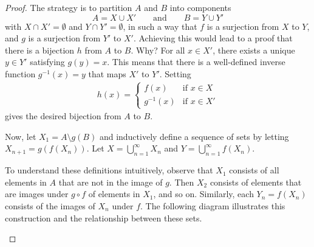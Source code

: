 \documentclass[11pt,twoside=off,numbers=noenddot]{scrbook}
\begin{document}
\begin{proof}
  The strategy is to partition $A$ and $B$ into components
  \[ A = X \cup X' \qquad \text{and} \qquad B = Y \cup Y' \]
  with $X \cap X' = \emptyset$ and $Y \cap Y' = \emptyset$, in such a
  way that $f$ is a surjection from $X$ to $Y$, and $g$ is a
  surjection from $Y'$ to $X'$. Achieving this would lead to a proof
  that there is a bijection $h$ from $A$ to $B$. Why? For all $x \in
  X'$, there exists a unique $y \in Y'$ satisfying $g(y) = x$. This
  means that there is a well-defined inverse function $g^{-1}(x) = y$
  that maps $X'$ to $Y'$. Setting
  \begin{align*}
    h(x) =
    \begin{cases}
      f(x) & \text{if $x \in X$} \\
      g^{-1}(x) & \text{if $x \in X'$}
    \end{cases}
  \end{align*}
  gives the desired bijection from $A$ to $B$.

  Now, let $X_1 = A \setminus g(B)$ and inductively define a sequence
  of sets by letting $X_{n + 1} = g(f(X_n))$.  Let $X = \bigcup_{n =
  1}^{\infty} X_n$ and $Y = \bigcup_{n = 1}^{\infty} f(X_n)$.

  To understand these definitions intuitively, observe that $X_1$
  consists of all elements in $A$ that are not in the image of $g$.
  Then $X_2$ consists of elements that are images under $g \circ f$
  of elements in $X_1$, and so on. Similarly, each $Y_n = f(X_n)$
  consists of the images of $X_n$ under $f$. The following diagram
  illustrates this construction and the relationship between these sets.

  \begin{tightfigure}
    \centering
\end{tightfigure}
\end{proof}
\end{document}
